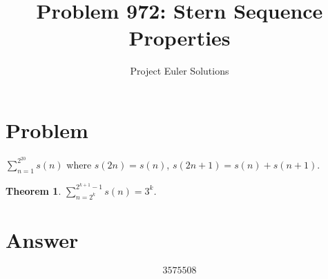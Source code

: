 \documentclass[11pt]{article}
\title{Problem 972: Stern Sequence Properties}
\author{Project Euler Solutions}
\date{}
\newtheorem{theorem}{Theorem}
\begin{document}
\maketitle
\section{Problem}
$\sum_{n=1}^{2^{20}} s(n)$ where $s(2n)=s(n)$, $s(2n+1)=s(n)+s(n+1)$.
\begin{theorem}
$\sum_{n=2^k}^{2^{k+1}-1} s(n) = 3^k$.
\end{theorem}
\section{Answer}

\[
\boxed{3575508}
\]
\end{document}
